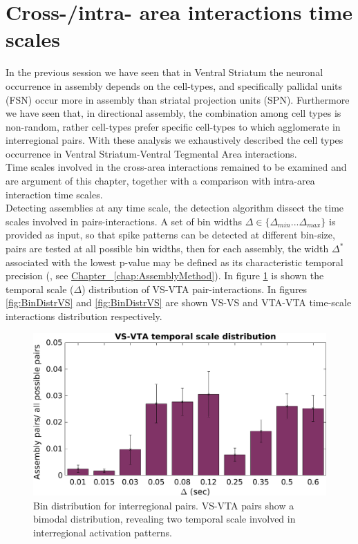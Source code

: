 \section{Cross-/intra- area interactions time scales}
\label{sec:TimeScales}
In the previous session we have seen that in Ventral Striatum the neuronal occurrence in assembly depends on the cell-types, and specifically pallidal units (FSN) occur more in assembly than striatal projection units (SPN). Furthermore we have seen that, in directional assembly, the combination among cell types is non-random, rather cell-types prefer specific cell-types to which agglomerate in interregional pairs.
With these analysis we exhaustively described the cell types occurrence in Ventral Striatum-Ventral Tegmental Area interactions.\\Time scales involved in the cross-area interactions remained to be examined and are argument of this chapter, together with a comparison with intra-area interaction time scales.\\
Detecting assemblies at any time scale, the detection algorithm dissect the time scales involved in pairs-interactions. A set of bin widths $\Delta \in \{\Delta_{min}...\Delta_{max}\}$ is provided as input, so that spike patterns can be detected at different bin-size, pairs are tested at all possible bin widths, then for each assembly, the width $\Delta^*$ associated with the lowest p-value may be defined as its characteristic temporal precision (\cite{RussoDurstewitz}, see \hyperref[chap:AssemblyMethod]{Chapter~ \ref*{chap:AssemblyMethod}}).
In figure  \ref{fig:BinDistr} is shown the temporal scale ($\Delta$) distribution of VS-VTA pair-interactions.
In figures \ref{fig:BinDistrVS} and \ref{fig:BinDistrVS} are shown VS-VS and VTA-VTA time-scale interactions distribution respectively.\\
\begin{figure}[H]
\includegraphics[scale=0.5]{figures/VS_VTA_Short1.png}
\caption{Bin distribution for interregional pairs. VS-VTA pairs show a bimodal distribution, revealing two temporal scale involved in interregional activation patterns.}
\label{fig:BinDistr}
\end{figure}
